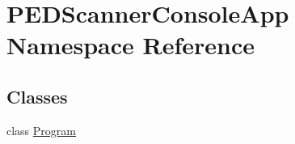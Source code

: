 \hypertarget{namespace_p_e_d_scanner_console_app}{}\section{P\+E\+D\+Scanner\+Console\+App Namespace Reference}
\label{namespace_p_e_d_scanner_console_app}
\subsection*{Classes}
\begin{DoxyCompactItemize}
\item 
class \mbox{\hyperlink{class_p_e_d_scanner_console_app_1_1_program}{Program}}
\end{DoxyCompactItemize}
